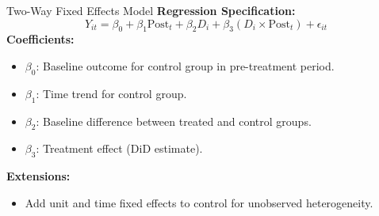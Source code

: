 \documentclass[xcolor=svgnames,t]{beamer}
\begin{document}
    \begin{frame}{Two-Way Fixed Effects Model}
    \textbf{Regression Specification:}
    \begin{equation*}
    Y_{it} = \beta_0 + \beta_1 \text{Post}_t + \beta_2 D_i + \beta_3 (D_i \times \text{Post}_t) + \epsilon_{it}
    \end{equation*}
    \pause
    \textbf{Coefficients:}
    \begin{itemize}
        \item \(\beta_0\): Baseline outcome for control group in pre-treatment period.
        \item \(\beta_1\): Time trend for control group.
        \item \(\beta_2\): Baseline difference between treated and control groups.
        \item \(\beta_3\): Treatment effect (DiD estimate).
    \end{itemize}
    \pause
    \textbf{Extensions:}
    \begin{itemize}
        \item Add unit and time fixed effects to control for unobserved heterogeneity.
    \end{itemize}
    \end{frame}
    
\end{document}
